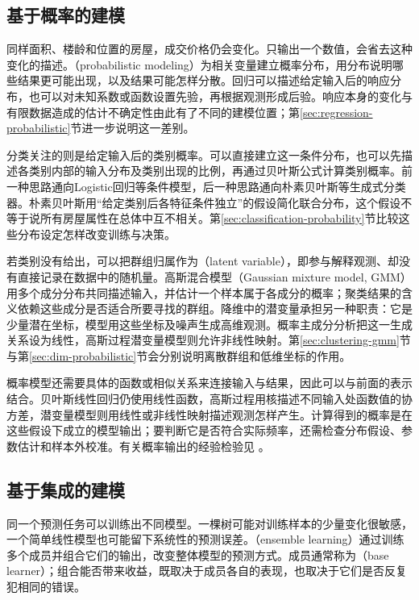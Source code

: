 \subsection{基于概率的建模}
\label{sec:classic-overview-probabilistic}

同样面积、楼龄和位置的房屋，成交价格仍会变化。只输出一个数值，会省去这种变化的描述。（probabilistic modeling）为相关变量建立概率分布，用分布说明哪些结果更可能出现，以及结果可能怎样分散。回归可以描述给定输入后的响应分布，也可以对未知系数或函数设置先验，再根据观测形成后验。响应本身的变化与有限数据造成的估计不确定性由此有了不同的建模位置；第\ref{sec:regression-probabilistic}节进一步说明这一差别。

分类关注的则是给定输入后的类别概率。可以直接建立这一条件分布，也可以先描述各类别内部的输入分布及类别出现的比例，再通过贝叶斯公式计算类别概率。前一种思路通向Logistic回归等条件模型，后一种思路通向朴素贝叶斯等生成式分类器。朴素贝叶斯用“给定类别后各特征条件独立”的假设简化联合分布，这个假设不等于说所有房屋属性在总体中互不相关。第\ref{sec:classification-probability}节比较这些分布设定怎样改变训练与决策。

若类别没有给出，可以把群组归属作为（latent variable），即参与解释观测、却没有直接记录在数据中的随机量。高斯混合模型（Gaussian mixture model, GMM）用多个成分分布共同描述输入，并估计一个样本属于各成分的概率；聚类结果的含义依赖这些成分是否适合所要寻找的群组。降维中的潜变量承担另一种职责：它是少量潜在坐标，模型用这些坐标及噪声生成高维观测。概率主成分分析把这一生成关系设为线性，高斯过程潜变量模型则允许非线性映射。第\ref{sec:clustering-gmm}节与第\ref{sec:dim-probabilistic}节会分别说明离散群组和低维坐标的作用。

概率模型还需要具体的函数或相似关系来连接输入与结果，因此可以与前面的表示结合。贝叶斯线性回归仍使用线性函数，高斯过程用核描述不同输入处函数值的协方差，潜变量模型则用线性或非线性映射描述观测怎样产生。计算得到的概率是在这些假设下成立的模型输出；要判断它是否符合实际频率，还需检查分布假设、参数估计和样本外校准。有关概率输出的经验检验见
。

\subsection{基于集成的建模}
\label{sec:classic-overview-ensemble}

同一个预测任务可以训练出不同模型。一棵树可能对训练样本的少量变化很敏感，一个简单线性模型也可能留下系统性的预测误差。（ensemble learning）通过训练多个成员并组合它们的输出，改变整体模型的预测方式。成员通常称为（base learner）；组合能否带来收益，既取决于成员各自的表现，也取决于它们是否反复犯相同的错误。


